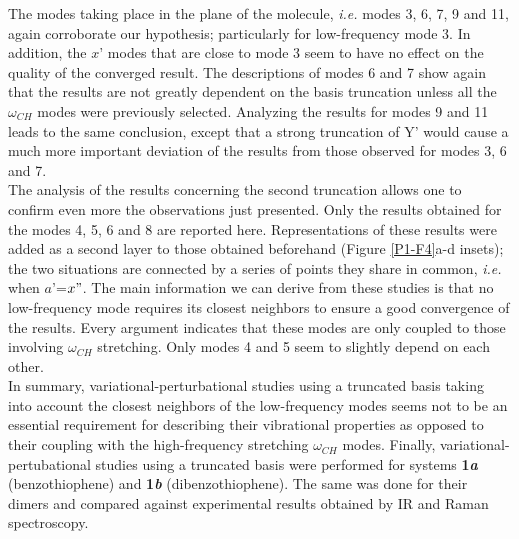 	The modes taking place in the plane of the molecule, \textit{i.e.} modes 3, 6, 7, 9 and 11, again corroborate our hypothesis; particularly for low-frequency mode 3. In addition, the $x’$ modes that are close to mode 3 seem to have no effect on the quality of the converged result. The descriptions of modes 6 and 7 show again that the results are not greatly dependent on the basis truncation unless all the $\omega_{CH}$ modes were previously selected. Analyzing the results for modes 9 and 11 leads to the same conclusion, except that a strong truncation of Y’ would cause a much more important deviation of the results from those observed for modes 3, 6 and 7.\\
	
	The analysis of the results concerning the second truncation allows one to confirm even more the observations just presented. Only the results obtained for the modes 4, 5, 6 and 8 are reported here. Representations of these results were added as a second layer to those obtained beforehand (Figure \ref{P1-F4}a-d insets); the two situations are connected by a series of points they share in common, \textit{i.e.} when $a’$=$x"$. The main information we can derive from these studies is that no low-frequency mode requires its closest neighbors to ensure a good convergence of the results. Every argument indicates that these modes are only coupled to those involving $\omega_{CH}$ stretching. Only modes 4 and 5 seem to slightly depend on each other.\\
	
		In summary, variational-perturbational studies using a truncated basis taking into account the closest neighbors of the low-frequency modes seems not to be an essential requirement for describing their vibrational properties as opposed to their coupling with the high-frequency stretching $\omega_{CH}$ modes. Finally, variational-pertubational studies using a truncated basis were performed for systems \textbf{1\textit{a}} (benzothiophene) and \textbf{1\textit{b}} (dibenzothiophene). The same was done for their dimers and compared against experimental results obtained by IR and Raman spectroscopy.\\
	
